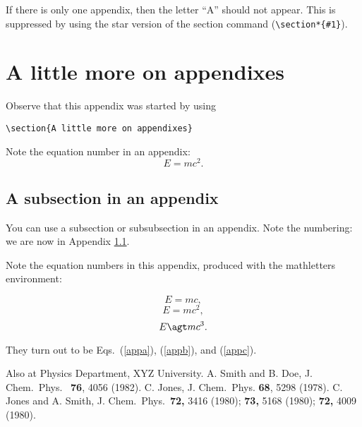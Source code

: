  If there is only
one appendix, then the letter ``A'' should not appear. This is suppressed by
using the star version of the section command (\verb+\section*{#1}+).


\section{A little more on appendixes}

Observe that this appendix was started by using
\begin{verbatim}
\section{A little more on appendixes}
\end{verbatim}

Note the equation number in an appendix:
\begin{equation} E=mc^2. \end{equation}

\subsection{A subsection in an appendix}
\label{app:subsec}

You can use a subsection or subsubsection in an
appendix. Note the numbering: we are now in Appendix \ref{app:subsec}.





Note the equation numbers in this appendix, produced
with the mathletters environment:
\begin{mathletters}
\begin{equation} E=mc, \label{appa}\end{equation}
\begin{equation} E=mc^2, \label{appb}\end{equation}
\begin{equation} E\agt mc^3. \label{appc}\end{equation}
\end{mathletters}
They turn out to be Eqs.\ (\ref{appa}), (\ref{appb}),
and (\ref{appc}).

\begin{references}
  Also at Physics Department, XYZ University.
A. Smith  and B. Doe, J. Chem.\  Phys.\ {\bf
76}, 4056 (1982).
C. Jones, J. Chem.\ Phys. {\bf 68}, 5298 (1978).
C. Jones and A. Smith,
J. Chem.\ Phys.\ {\bf 72,}
3416 (1980); {\bf 73,} 5168 (1980); {\bf72,} 4009 (1980).
\end{references}



